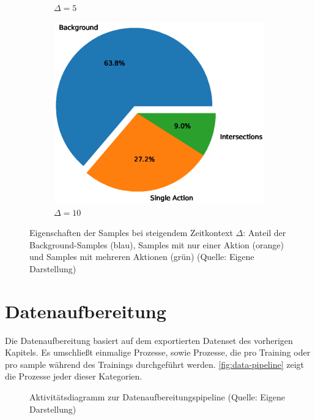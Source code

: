 \begin{figure}
\begin{subfigure}{.24\textwidth}
        \caption{$\Delta = 5$}
    \end{subfigure}
    \begin{subfigure}{.24\textwidth}
        \centering
        \includegraphics[width=.95\linewidth]{img/05_background_ratio_all_delta_10.eps}
        \caption{$\Delta = 10$}
    \end{subfigure}
    \caption[Eigenschaften der Samples bei steigendem Zeitkontext $\Delta$]{Eigenschaften der Samples bei steigendem Zeitkontext $\Delta$: Anteil der Background-Samples (blau), Samples mit nur einer Aktion (orange) und Samples mit mehreren Aktionen (grün) (Quelle: Eigene Darstellung)}
    \label{fig:ratios}
\end{figure}

\section{Datenaufbereitung}
\label{sec:pre-processing}

Die Datenaufbereitung basiert auf dem exportierten Datenset des vorherigen Kapitels.
Es umschließt einmalige Prozesse, sowie Prozesse, die pro Training oder pro \gls{sample} während des Trainings durchgeführt werden.
\autoref{fig:data-pipeline} zeigt die Prozesse jeder dieser Kategorien.

\begin{figure}
    \centering
    \caption[Aktivitätsdiagramm zur Datenaufbereitungspipeline]{Aktivitätsdiagramm zur Datenaufbereitungspipeline (Quelle: Eigene Darstellung)}
    \label{fig:data-pipeline}
\end{figure}

